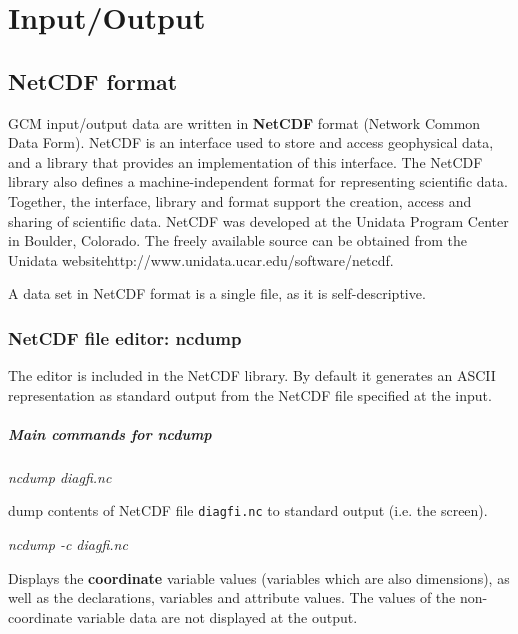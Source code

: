 \chapter{Input/Output}
\label{sc:io}

\section{NetCDF format}

GCM input/output data are written in {\bf NetCDF} format
(Network Common Data Form). NetCDF is an interface used to store and access
geophysical data, and a library that provides an implementation of this
interface. The NetCDF library also defines a machine-independent format for
representing scientific data.
Together, the interface, library and format support the creation, access and
sharing of scientific data. NetCDF was developed at the Unidata Program Center
in Boulder, Colorado. The freely available source can be obtained from
{the Unidata website}{http://www.unidata.ucar.edu/software/netcdf}.

A data set in NetCDF format is a single file, as it is self-descriptive.

\subsection{NetCDF file editor: ncdump}

The editor is included in the NetCDF library.
By default it generates an ASCII representation as standard output
from the NetCDF file specified at the input.

\paragraph{Main commands for  ncdump}

\begin{center}
{\it ncdump diagfi.nc}
\end{center}

\noindent
dump contents of NetCDF file {\tt diagfi.nc} to standard output
(i.e. the screen).

\begin{center}
{\it ncdump -c diagfi.nc}
\end{center}

\noindent
Displays the {\bf coordinate} variable values (variables which are also
dimensions), as well as the declarations, variables and attribute values.
The values of the non-coordinate variable data are not displayed at
the output.

